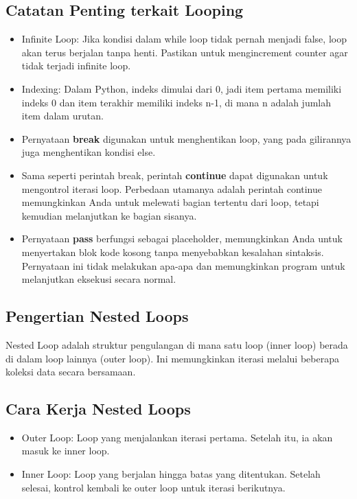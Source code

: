 \documentclass{article}
\begin{document}
\subsection{Catatan Penting terkait Looping}
\begin{itemize}
    \item Infinite Loop: Jika kondisi dalam while loop tidak pernah menjadi false, loop akan terus berjalan tanpa henti. Pastikan untuk mengincrement counter agar tidak terjadi infinite loop.
    \item Indexing: Dalam Python, indeks dimulai dari 0, jadi item pertama memiliki indeks 0 dan item terakhir memiliki indeks n-1, di mana n adalah jumlah item dalam urutan.
    \item Pernyataan \textbf{break} digunakan untuk menghentikan loop, yang pada gilirannya juga menghentikan kondisi else.
    \item Sama seperti perintah break, perintah \textbf{continue} dapat digunakan untuk mengontrol iterasi loop. Perbedaan utamanya adalah perintah continue memungkinkan Anda untuk melewati bagian tertentu dari loop, tetapi kemudian melanjutkan ke bagian sisanya.
    \item Pernyataan \textbf{pass} berfungsi sebagai placeholder, memungkinkan Anda untuk menyertakan blok kode kosong tanpa menyebabkan kesalahan sintaksis. Pernyataan ini tidak melakukan apa-apa dan memungkinkan program untuk melanjutkan eksekusi secara normal.
\end{itemize}

\subsection{Pengertian Nested Loops}
Nested Loop adalah struktur pengulangan di mana satu loop (inner loop) berada di dalam loop lainnya (outer loop). Ini memungkinkan iterasi melalui beberapa koleksi data secara bersamaan.

\subsection{Cara Kerja Nested Loops}
\begin{itemize}
    \item Outer Loop: Loop yang menjalankan iterasi pertama. Setelah itu, ia akan masuk ke inner loop.
    \item Inner Loop: Loop yang berjalan hingga batas yang ditentukan. Setelah selesai, kontrol kembali ke outer loop untuk iterasi berikutnya.
\end{itemize}
\end{document}
